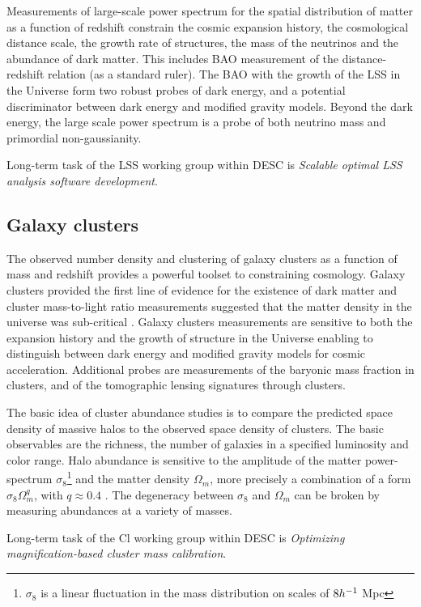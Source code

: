Measurements of large-scale power spectrum for the spatial distribution of matter as a function of redshift constrain the cosmic expansion history, the cosmological distance scale, the growth rate of structures, the mass of the neutrinos and the abundance of dark matter. This includes BAO measurement of the distance-redshift relation (as a standard ruler). The BAO with the growth of the LSS in the Universe form two robust probes of dark energy, and a potential discriminator between dark energy and modified gravity models. Beyond the dark energy, the large scale power spectrum is a probe of both neutrino mass and primordial non-gaussianity.

Long-term task of the LSS working group within DESC is \textit{Scalable optimal LSS analysis software development}.
\subsection{Galaxy clusters}
The observed number density and clustering of galaxy clusters as a function of mass and redshift provides a powerful toolset to constraining cosmology.  Galaxy clusters provided the first line of evidence for the existence of dark matter \cite{zwicky} and cluster mass-to-light ratio measurements suggested that the matter density in the universe was sub-critical \cite{Gott}. Galaxy clusters measurements are sensitive to both the expansion history and the growth of structure in the Universe enabling to distinguish between dark energy and modified gravity models for cosmic acceleration. Additional probes are measurements of the baryonic mass fraction in clusters, and of the tomographic lensing signatures through clusters.

The basic idea of cluster abundance studies is to compare the predicted space density of massive halos to the observed space density of clusters. The basic observables are the richness, the number of galaxies in a specified luminosity and color range. Halo abundance is sensitive to the amplitude of the matter power-spectrum $\sigma_8$\footnote{$\sigma_8$ is a linear fluctuation in the mass distribution on scales of $8h^{-1}$ Mpc} and the matter density $\Omega_m$, more precisely a combination of a form $\sigma_8\Omega_m^q$, with $q\approx0.4$ \cite{white}. The degeneracy between $\sigma_8$ and $\Omega_m$ can be broken by measuring abundances at a variety of masses.

Long-term task of the Cl working group within DESC is \textit{Optimizing magnification-based cluster mass calibration}.
